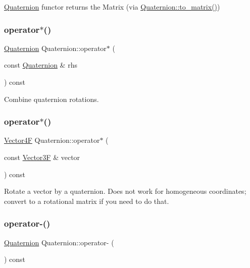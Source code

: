 \mbox{\hyperlink{class_quaternion}{Quaternion}} functor returns the Matrix (via \mbox{\hyperlink{class_quaternion_ae0309902fc8b7d8aa1f4075a73fee928}{Quaternion\+::to\+\_\+matrix()}}) \mbox{\label{class_quaternion_a7cc9bf508bfd8d521a0d246a2cb47194}} 
\subsubsection{\texorpdfstring{operator$\ast$()}{operator*()}\hspace{0.1cm}{\footnotesize\ttfamily [1/2]}}
{\footnotesize\ttfamily \mbox{\hyperlink{class_quaternion}{Quaternion}} Quaternion\+::operator$\ast$ (\begin{DoxyParamCaption}\item[{const \mbox{\hyperlink{class_quaternion}{Quaternion}} \&}]{rhs }\end{DoxyParamCaption}) const}

Combine quaternion rotations. \mbox{\label{class_quaternion_af0ec7fb0212b1761149d9bd36bf87455}} 
\subsubsection{\texorpdfstring{operator$\ast$()}{operator*()}\hspace{0.1cm}{\footnotesize\ttfamily [2/2]}}
{\footnotesize\ttfamily \mbox{\hyperlink{class_vector4}{Vector4F}} Quaternion\+::operator$\ast$ (\begin{DoxyParamCaption}\item[{const \mbox{\hyperlink{class_vector3}{Vector3F}} \&}]{vector }\end{DoxyParamCaption}) const}

Rotate a vector by a quaternion. Does not work for homogeneous coordinates; convert to a rotational matrix if you need to do that. \mbox{\label{class_quaternion_aff7a0a5aeea4a3fe860cb90a649e389c}} 
\subsubsection{\texorpdfstring{operator-\/()}{operator-()}}
{\footnotesize\ttfamily \mbox{\hyperlink{class_quaternion}{Quaternion}} Quaternion\+::operator-\/ (\begin{DoxyParamCaption}{ }\end{DoxyParamCaption}) const}

